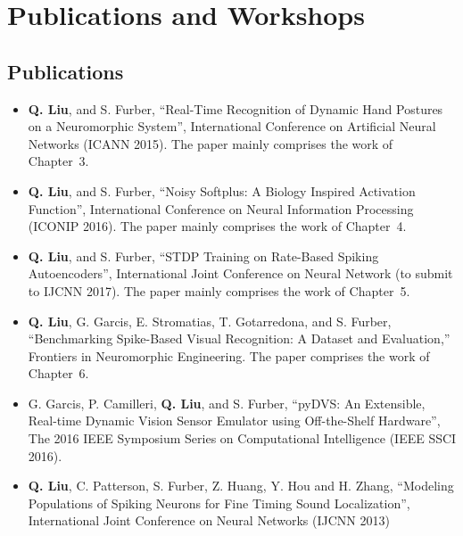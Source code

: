    
\section{Publications and Workshops}
\subsection{Publications}
\begin{itemize}
	\item 
	\textbf{Q. Liu}, and S. Furber, “Real-Time Recognition of Dynamic Hand Postures on a Neuromorphic System”, International Conference on Artificial Neural Networks (ICANN 2015).
	The paper mainly comprises the work of Chapter~3.
	
	\item 
	\textbf{Q. Liu}, and S. Furber, “Noisy Softplus: A Biology Inspired Activation Function”, International Conference on Neural Information Processing (ICONIP 2016). 
	The paper mainly comprises the work of Chapter~4.
	
	
	\item 
	\textbf{Q. Liu}, and S. Furber, “STDP Training on Rate-Based Spiking Autoencoders”, International Joint Conference on Neural Network (to submit to IJCNN 2017).
	The paper mainly comprises the work of Chapter~5.
	
	\item 
	\textbf{Q. Liu}, G. Garcis, E. Stromatias, T. Gotarredona, and S. Furber, “Benchmarking Spike-Based Visual Recognition: A Dataset and Evaluation,” Frontiers in Neuromorphic Engineering.
	The paper comprises the work of Chapter~6.
	

	\item 
	G. Garcis, P. Camilleri, \textbf{Q. Liu}, and S. Furber, “pyDVS: An Extensible, Real-time Dynamic Vision Sensor Emulator using Off-the-Shelf Hardware”, The 2016 IEEE Symposium Series on Computational Intelligence (IEEE SSCI 2016).
	
	\item
	\textbf{Q. Liu}, C. Patterson, S. Furber, Z. Huang, Y. Hou and H. Zhang, “Modeling Populations of Spiking Neurons for Fine Timing Sound Localization”, International Joint Conference on Neural Networks (IJCNN 2013)
\end{itemize}	

